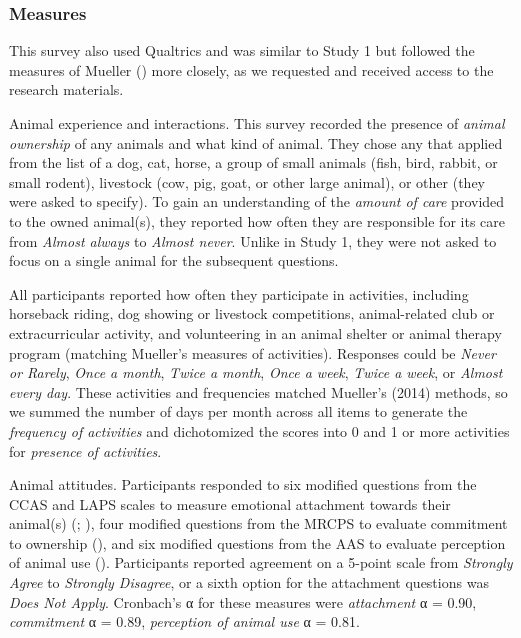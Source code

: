 \documentclass[
  jou,
  longtable,
  nolmodern,
  notxfonts,
  notimes,
  colorlinks=true,linkcolor=blue,citecolor=blue,urlcolor=blue]{apa7}
\begin{document}
\subsubsection{Measures}\label{measures-1}

This survey also used Qualtrics and was similar to Study 1 but followed
the measures of Mueller () more
closely, as we requested and received access to the research materials.

{Animal experience and interactions.} This survey recorded the presence
of \emph{animal ownership} of any animals and what kind of animal. They
chose any that applied from the list of a dog, cat, horse, a group of
small animals (fish, bird, rabbit, or small rodent), livestock (cow,
pig, goat, or other large animal), or other (they were asked to
specify). To gain an understanding of the \emph{amount of care} provided
to the owned animal(s), they reported how often they are responsible for
its care from \emph{Almost always} to \emph{Almost never}. Unlike in
Study 1, they were not asked to focus on a single animal for the
subsequent questions.

All participants reported how often they participate in activities,
including horseback riding, dog showing or livestock competitions,
animal-related club or extracurricular activity, and volunteering in an
animal shelter or animal therapy program (matching Mueller's measures of
activities). Responses could be \emph{Never or Rarely}, \emph{Once a
month}, \emph{Twice a month}, \emph{Once a week}, \emph{Twice a week},
or \emph{Almost every day}. These activities and frequencies matched
Mueller's (2014) methods, so we summed the number of days per month
across all items to generate the \emph{frequency of activities} and
dichotomized the scores into 0 and 1 or more activities for
\emph{presence of activities}.

{Animal attitudes.} Participants responded to six modified questions
from the CCAS and LAPS scales to measure emotional attachment towards
their animal(s) (;
), four modified questions
from the MRCPS to evaluate commitment to ownership
(), and six modified
questions from the AAS to evaluate perception of animal use
(). Participants
reported agreement on a 5-point scale from \emph{Strongly Agree} to
\emph{Strongly Disagree}, or a sixth option for the attachment questions
was \emph{Does Not Apply}. Cronbach's α for these measures were
\emph{attachment} α = 0.90, \emph{commitment} α = 0.89, \emph{perception
of animal use} α = 0.81.
\end{document}
